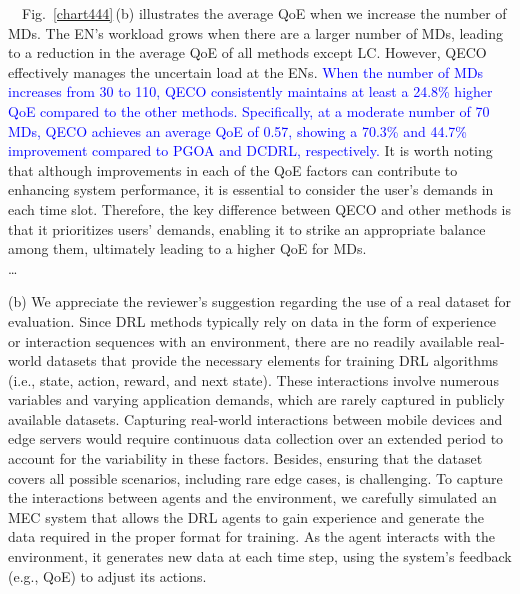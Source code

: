 \documentclass[12pt,draftclsnofoot,onecolumn]{IEEEtran}
\newenvironment{my}[2]%
{\begin{list}{}%
{\setlength{\rightmargin}{#1}\setlength{\leftmargin}{#2}}%


 \item[]{}

} {\end{list}}
\begin{document}
\begin{enumerate}
\begin{my}{1cm}{1cm}
{{\,\,\,\, Fig.~\ref{chart444}\,(b) illustrates the average QoE when we increase the number of MDs. The EN's workload grows when there are a larger number of MDs, leading to a reduction in the average QoE of all methods except LC. However, QECO effectively manages the uncertain load at the ENs. \textcolor{blue}{When the number of MDs increases from 30 to 110, QECO consistently maintains at least a 24.8\% higher QoE compared to the other methods. Specifically, at a moderate number of 70 MDs, QECO achieves an average QoE of 0.57, showing a 70.3\% and 44.7\% improvement compared to PGOA and DCDRL, respectively.} It is worth noting that although improvements in each of the QoE factors can contribute to enhancing system performance, it is essential to consider the user's demands in each time slot. Therefore, the key difference between QECO and other methods is that it prioritizes users' demands, enabling it to strike an appropriate balance among them, ultimately leading to a higher QoE for MDs.
 \vspace{3mm}\\\dots }}

\end{my}\vspace{6mm}






(b) We appreciate the reviewer’s suggestion regarding the use of a real dataset for evaluation. Since DRL methods typically rely on data in the form of experience or interaction sequences with an environment, there are no readily available real-world datasets that provide the necessary elements for training DRL algorithms (i.e., state, action, reward, and next state). These interactions involve numerous variables and varying application demands, which are rarely captured in publicly available datasets. Capturing real-world interactions between mobile devices and edge servers would require continuous data collection over an extended period to account for the variability in these factors. Besides, ensuring that the dataset covers all possible scenarios, including rare edge cases, is challenging. To capture the interactions between agents and the environment, we carefully simulated an MEC system that allows the DRL agents to gain experience and generate the data required in the proper format for training. As the agent interacts with the environment, it generates new data at each time step, using the system’s feedback (e.g., QoE) to adjust its actions. \vspace{3mm}


\end{enumerate}
\end{document}
